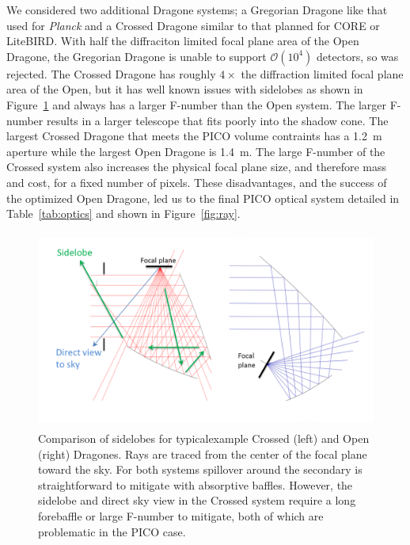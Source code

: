 \documentclass[]{spie}  %
\begin{document}
We considered two additional Dragone systems; a Gregorian Dragone like that used for \textit{Planck} and a Crossed Dragone similar to that planned 
for CORE or LiteBIRD.  With half the diffraciton limited focal plane area of the Open Dragone,\cite{core2018_inst} the Gregorian Dragone is 
unable to support $\mathcal{O}(10^4)$ detectors, so was rejected.  
The Crossed Dragone has roughly $4\times$ the diffraction limited focal plane area of the Open, but it has well 
known issues with sidelobes as shown in Figure~\ref{fig:sidelobes} and always has a larger F-number than the Open system.  The larger 
F-number results in a larger telescope that fits poorly into the shadow cone. The largest Crossed Dragone that meets the PICO volume contraints has 
a 1.2~m aperture while the largest Open Dragone is 1.4~m. The large F-number of the Crossed system also increases 
the physical focal plane size, and therefore mass and cost, for a fixed number of pixels.  These disadvantages, and the success of the optimized 
Open Dragone, led us to the final PICO optical system detailed in Table~\ref{tab:optics} and shown in Figure~\ref{fig:ray}.


\begin{figure} [ht]
\begin{center}
\includegraphics[height=6.5cm]{sidelobes.png}
\end{center}
\caption { \label{fig:sidelobes} 
Comparison of sidelobes for typicalexample Crossed (left) and Open (right) Dragones.  Rays are traced from the center of the focal plane toward the sky.
For both systems spillover around the secondary is straightforward to mitigate with absorptive baffles.  However, the sidelobe and direct 
sky view in the Crossed system require a long forebaffle or large F-number to mitigate, both of which are problematic in the PICO case.}
\end{figure} 
\end{document}
